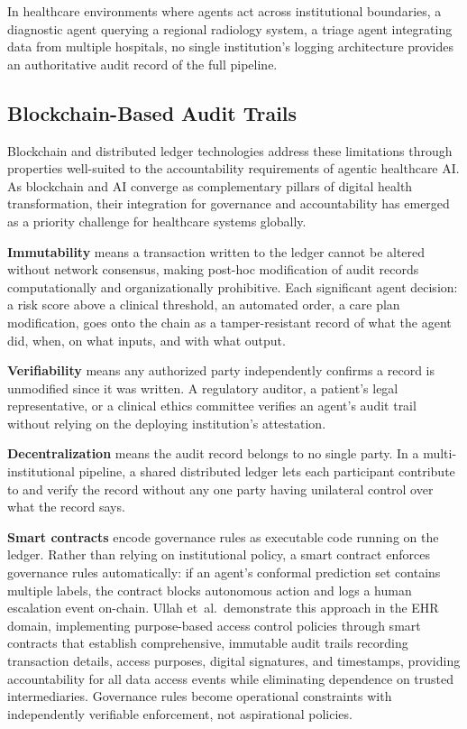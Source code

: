 \documentclass[12pt,a4paper]{article}
\begin{document}
In healthcare environments where agents act across institutional
boundaries, a diagnostic agent querying a regional radiology
system, a triage agent integrating data from multiple hospitals,
no single institution's logging architecture provides an
authoritative audit record of the full pipeline.

\subsection*{Blockchain-Based Audit Trails}

Blockchain and distributed ledger technologies address these
limitations through properties well-suited to the accountability
requirements of agentic healthcare AI. As blockchain and AI
converge as complementary pillars of digital health
transformation, their integration for governance and
accountability has emerged as a priority challenge for healthcare
systems globally.\cite{dershem2025}

\textbf{Immutability} means a transaction written to the ledger
cannot be altered without network consensus, making post-hoc
modification of audit records computationally and
organizationally prohibitive. Each significant agent decision: a
risk score above a clinical threshold, an automated order, a care
plan modification, goes onto the chain as a tamper-resistant
record of what the agent did, when, on what inputs, and with what
output.

\textbf{Verifiability} means any authorized party independently
confirms a record is unmodified since it was written. A
regulatory auditor, a patient's legal representative, or a
clinical ethics committee verifies an agent's audit trail
without relying on the deploying institution's attestation.

\textbf{Decentralization} means the audit record belongs to no
single party. In a multi-institutional pipeline, a shared
distributed ledger lets each participant contribute to and verify
the record without any one party having unilateral control over
what the record says.\cite{ullah2024}

\textbf{Smart contracts} encode governance rules as executable
code running on the ledger. Rather than relying on institutional
policy, a smart contract enforces governance rules automatically:
if an agent's conformal prediction set contains multiple labels,
the contract blocks autonomous action and logs a human escalation
event on-chain. Ullah et~al.\ demonstrate this approach in the
EHR domain, implementing purpose-based access control policies
through smart contracts that establish comprehensive, immutable
audit trails recording transaction details, access purposes,
digital signatures, and timestamps, providing accountability for
all data access events while eliminating dependence on trusted
intermediaries.\cite{ullah2024} Governance rules become
operational constraints with independently verifiable
enforcement, not aspirational policies.
\end{document}
